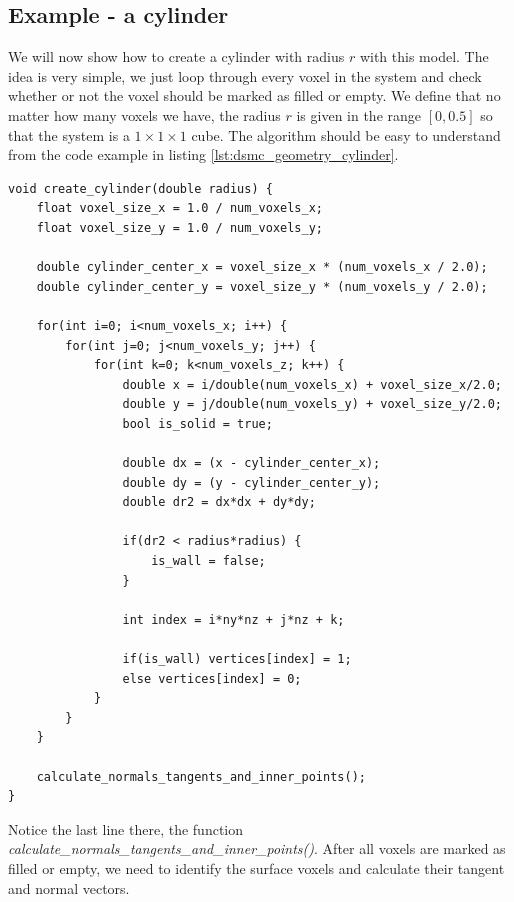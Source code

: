 \subsection{Example - a cylinder}
We will now show how to create a cylinder with radius $r$ with this model. The idea is very simple, we just loop through every voxel in the system and check whether or not the voxel should be marked as filled or empty. We define that no matter how many voxels we have, the radius $r$ is given in the range $[0, 0.5]$ so that the system is a $1\times 1\times 1$ cube. The algorithm should be easy to understand from the code example in listing \ref{lst:dsmc_geometry_cylinder}.
\begin{lstlisting}[caption=An example showing how to create a cylinder., label=lst:dsmc_geometry_cylinder]
void create_cylinder(double radius) {
	float voxel_size_x = 1.0 / num_voxels_x;
	float voxel_size_y = 1.0 / num_voxels_y;

	double cylinder_center_x = voxel_size_x * (num_voxels_x / 2.0);
	double cylinder_center_y = voxel_size_y * (num_voxels_y / 2.0);

	for(int i=0; i<num_voxels_x; i++) {
	    for(int j=0; j<num_voxels_y; j++) {
	        for(int k=0; k<num_voxels_z; k++) {
	            double x = i/double(num_voxels_x) + voxel_size_x/2.0;
	            double y = j/double(num_voxels_y) + voxel_size_y/2.0;
	            bool is_solid = true;

	            double dx = (x - cylinder_center_x);
	            double dy = (y - cylinder_center_y);
	            double dr2 = dx*dx + dy*dy;

	            if(dr2 < radius*radius) {
	                is_wall = false;
	            }

	            int index = i*ny*nz + j*nz + k;

	            if(is_wall) vertices[index] = 1;
	            else vertices[index] = 0;
	        }
	    }
	}

	calculate_normals_tangents_and_inner_points();
}
\end{lstlisting}
Notice the last line there, the function \textit{calculate\_normals\_tangents\_and\_inner\_points()}. After all voxels are marked as filled or empty, we need to identify the surface voxels and calculate their tangent and normal vectors.
